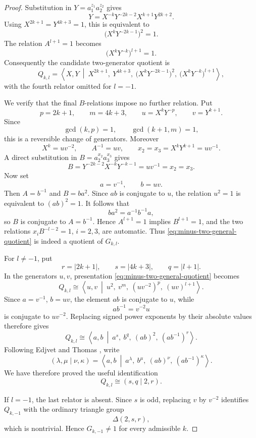 \documentclass{article}
\begin{document}
\begin{proof}
Substitution in \(Y=a_1^{z_1}a_2^{z_2}\) gives
\[
 Y=X^{-k}Y^{-2k-2}X^{k+1}Y^{2k+2}.
\]
Using \(X^{2k+1}=Y^{4k+3}=1\), this is equivalent to
\[
 \bigl(X^kY^{-2k-1}\bigr)^2=1.
\]
The relation \(A^{l+1}=1\) becomes
\[
 \bigl(X^kY^{-k}\bigr)^{l+1}=1.
\]
Consequently the candidate two-generator quotient is
\begin{equation}\label{eq:minus-two-general-quotient}
 Q_{k,l}=
 \left\langle X,Y\ \middle|\
 X^{2k+1},\ Y^{4k+3},\
 \bigl(X^kY^{-2k-1}\bigr)^2,\
 \bigl(X^kY^{-k}\bigr)^{l+1}
 \right\rangle,
\end{equation}
with the fourth relator omitted for \(l=-1\).

We verify that the final \(B\)-relations impose no further relation.
Put
\[
 p=2k+1,\qquad m=4k+3,
\qquad u=X^kY^{-p},\qquad v=Y^{k+1}.
\]
Since
\[
 \gcd(k,p)=1,\qquad \gcd(k+1,m)=1,
\]
this is a reversible change of generators.  Moreover
\[
 X^k=uv^{-2},\qquad A^{-1}=uv,
 \qquad x_2=x_3=X^kY^{k+1}=uv^{-1}.
\]
A direct substitution in \(B=a_2^{x_2}a_3^{x_3}\) gives
\[
 B=Y^{-2k-2}X^{-k}Y^{-k-1}=uv^{-1}=x_2=x_3.
\]
Now set
\[
 a=v^{-1},\qquad b=uv.
\]
Then \(A=b^{-1}\) and \(B=ba^2\).  Since \(ab\) is conjugate to
\(u\), the relation \(u^2=1\) is equivalent to \((ab)^2=1\).  It follows
that
\[
 ba^2=a^{-1}b^{-1}a,
\]
so \(B\) is conjugate to \(A=b^{-1}\).  Hence \(A^{l+1}=1\) implies
\(B^{l+1}=1\), and the two relations
\(x_iB^{-l-2}=1\), \(i=2,3\), are automatic.  Thus
\eqref{eq:minus-two-general-quotient} is indeed a quotient of \(G_{k,l}\).

For \(l\neq-1\), put
\[
 r=|2k+1|,\qquad s=|4k+3|,\qquad q=|l+1|.
\]
In the generators \(u,v\), presentation
\eqref{eq:minus-two-general-quotient} becomes
\[
 Q_{k,l}\cong
 \left\langle u,v\ \middle|\
 u^2,\ v^m,\ (uv^{-2})^p,\ (uv)^{l+1}
 \right\rangle.
\]
Since \(a=v^{-1}\), \(b=uv\), the element \(ab\) is conjugate to
\(u\), while
\[
 ab^{-1}=v^{-2}u
\]
is conjugate to \(uv^{-2}\).  Replacing signed power exponents by their
absolute values therefore gives
\[
 Q_{k,l}\cong
 \left\langle a,b\ \middle|\
 a^s,\ b^q,\ (ab)^2,\ (ab^{-1})^r
 \right\rangle.
\]
Following Edjvet and Thomas \cite{ET}, write
\[
 (\lambda,\mu\mid\nu,\kappa)
 =\left\langle a,b\ \middle|\
 a^\lambda,\ b^\mu,\ (ab)^\nu,\ (ab^{-1})^\kappa
 \right\rangle.
\]
We have therefore proved the useful identification
\begin{equation}\label{eq:minus-two-ET-identification}
 \boxed{\quad Q_{k,l}\cong(s,q\mid2,r).\quad}
\end{equation}

If \(l=-1\), the last relator is absent.  Since \(s\) is odd, replacing
\(v\) by \(v^{-2}\) identifies \(Q_{k,-1}\) with the ordinary triangle
group
\[
 \Delta(2,s,r),
\]
which is nontrivial.  Hence \(G_{k,-1}\neq1\) for every admissible \(k\).


\end{proof}
\end{document}
